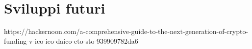\chapter{Sviluppi futuri}
https://hackernoon.com/a-comprehensive-guide-to-the-next-generation-of-crypto-funding-v-ico-ieo-daico-eto-sto-939909782da6